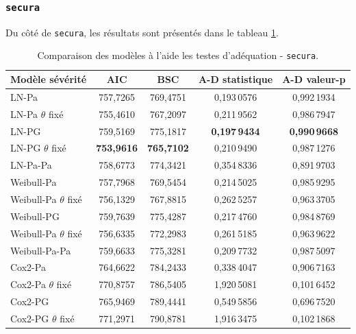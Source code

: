 		\subsubsection{\texttt{secura}} Du côté de \texttt{secura}, les résultats sont présentés dans le tableau \ref{TAB_TestGOF_Secura}. 
		\begin{table}[H]
		\centering
			\begin{tabular}{|l|cccc|}
				\hline			
				Modèle sévérité          &        AIC        &        BSC        &   A-D statistique    &     A-D valeur-p     \\ \hline
				LN-Pa                    &     757,7265      &     769,4751      &     0,193\,0576      &     0,992\,1934      \\
				LN-Pa $\theta$ fixé      &     755,4610      &     767,2097      &     0,211\,9562      &     0,986\,7947      \\
				LN-PG                    &     759,5169      &     775,1817      & \textbf{0,197\,9434} & \textbf{0,990\,9668} \\
				LN-PG $\theta$ fixé      & \textbf{753,9616} & \textbf{765,7102} &     0,210\,9490      &     0,987\,1276      \\
				LN-Pa-Pa                 &     758,6773      &     774,3421      &     0,354\,8336      &     0,891\,9703      \\
				Weibull-Pa               &     757,7968      &     769,5454      &     0,214\,5025      &     0,985\,9295      \\
				Weibull-Pa $\theta$ fixé &     756,1329      &     767,8815      &     0,262\,5257      &     0,963\,3705      \\
				Weibull-PG               &     759,7639      &     775,4287      &     0,217\,4760      &     0,984\,8769      \\
				Weibull-Pa $\theta$ fixé &     756,6335      &     772,2983      &     0,261\,5185      &     0,963\,9622      \\
				Weibull-Pa-Pa            &     759,6633      &     775,3281      &     0,209\,7732      &     0,987\,5097      \\
				Cox2-Pa                  &     764,6622      &     784,2433      &     0,338\,4047      &     0,906\,7163      \\
				Cox2-Pa $\theta$ fixé    &     770,8757      &     786,5405      &     1,920\,5081      &     0,101\,6452      \\
				Cox2-PG                  &     765,9469      &     789,4441      &     0,549\,5856      &     0,696\,7520      \\
				Cox2-PG $\theta$ fixé    &     771,2971      &     790,8781      &     1,916\,3475      &     0,102\,1868      \\ \hline
			\end{tabular}
			\renewcommand{\tablename}{Tableau}
			\caption{Comparaison des modèles à l'aide les testes d'adéquation - \texttt{secura}.}\label{TAB_TestGOF_Secura}
		\end{table}
	

